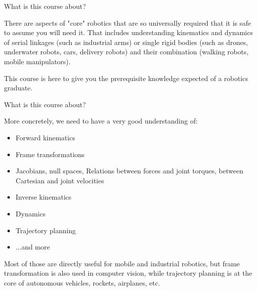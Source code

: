 \documentclass{beamer}
\begin{document}
\begin{frame}{What is this course about?}
\begin{flushleft}

There are aspects of "core" robotics that are so universally required that it is safe to assume you will need it. That includes understanding kinematics and dynamics of serial linkages (such as industrial arms) or single rigid bodies (such as drones, underwater robots, cars, delivery robots) and their combination (walking robots, mobile manipulators). 

\bigskip

This course is here to give you the prerequisite knowledge expected of a robotics graduate.

\end{flushleft}
\end{frame}



\begin{frame}{What is this course about?}
	\begin{flushleft}
		
		More concretely, we need to have a very good understanding of:
		
		\bigskip
		
		\begin{itemize}
			\item Forward kinematics
			\item Frame transformations
			\item Jacobians, null spaces, Relations between forces and joint torques, between Cartesian and joint velocities
			\item Inverse kinematics
			\item Dynamics
			\item Trajectory planning
			\item ...and more
		\end{itemize}
		
		Most of those are directly useful for mobile and industrial robotics, but frame transformation is also used in computer vision, while trajectory planning is at the core of autonomous vehicles, rockets, airplanes, etc.
		
	\end{flushleft}
\end{frame}
\end{document}
